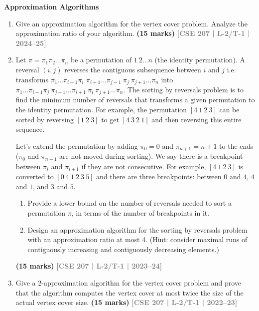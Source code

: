 \documentclass[12pt,a3paper]{article}
\newcommand{\yr}[1]{\hfill\textcolor{gray}{\small\textbf{[#1]}}}
\newcommand{\mk}[1]{\textcolor{orange!70!black}{\small\textbf{(#1 marks)}}}
\newcommand{\subtopic}[2]{%
  \vspace{10pt}
  \noindent\begin{tcolorbox}[colback=#1!8,colframe=#1,boxrule=0.6pt,arc=4pt,
    left=6pt,right=6pt,top=4pt,bottom=4pt]
    \small\bfseries\textcolor{#1}{#2}
  \end{tcolorbox}
  \vspace{2pt}
}
\begin{document}
\subtopic{cE}{Approximation Algorithms}
\label{sub:s5-approx}

\begin{enumerate}

\item Give an approximation algorithm for the vertex cover problem. Analyze the approximation ratio of your algorithm.
\mk{15} \yr{CSE 207 | L-2/T-1 | 2024--25}

\item Let $\pi = \pi_1 \pi_2 \dots \pi_n$ be a permutation of $1\ 2 \dots n$ (the identity permutation). A reversal 
$(i, j)$ reverses the contiguous subsequence between $i$ and $j$ i.e. transforms $\pi_1 \dots \pi_{i-1}\pi_i$ 
$\pi_{i+1} \dots \pi_{j-1}\ \pi_j\ \pi_{j+1} \dots \pi_{n}$ into $\pi_1 \dots \pi_{i-1}\pi_j\ \pi_{j-1} \dots \pi_{i+1}\ \pi_i\ \pi_{j+1} \dots \pi_n$. The sorting by 
reversals problem is to find the minimum number of reversals that transforms a given 
permutation to the identity permutation. For example, the permutation $[4\ 1\ 2\ 3]$ can be 
sorted by reversing $[1\ 2\ 3]$ to get $[4\ 3\ 2\ 1]$ and then reversing this entire sequence.

Let's extend the permutation by adding $\pi_0 = 0$ and $\pi_{n+1} = n + 1$ to the ends ($\pi_0$ and $\pi_{n+1}$ 
are not moved during sorting). We say there is a breakpoint between $\pi_i$ and $\pi_{i+1}$ if they 
are not consecutive. For example, $[4\ 1\ 2\ 3]$ is converted to $[0\ 4\ 1\ 2\ 3\ 5]$ and there are 
three breakpoints: between $0$ and $4$, $4$ and $1$, and $3$ and $5$.
\begin{enumerate}
  \item Provide a lower bound on the number of reversals needed to sort a permutation $\pi$, in terms of the number of breakpoints in it.
  \item Design an approximation algorithm for the sorting by reversals problem with an approximation ratio at most 4. (Hint: consider maximal runs of contiguously increasing and contiguously decreasing elements.)
\end{enumerate}
\mk{15} \yr{CSE 207 | L-2/T-1 | 2023--24}

\item Give a 2-approximation algorithm for the vertex cover problem and prove that the algorithm computes the vertex cover at most twice the size of the actual vertex cover size.
\mk{15} \yr{CSE 207 | L-2/T-1 | 2022--23}




\end{enumerate}
\end{document}
